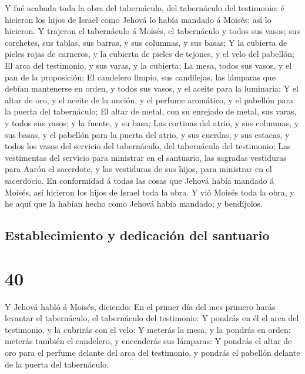  Y fué acabada toda la obra del tabernáculo, del
tabernáculo del testimonio: é hicieron los hijos de Israel como Jehová
lo había mandado á Moisés: así lo hicieron.  Y trajeron
el tabernáculo á Moisés, el tabernáculo y todos sus vasos; sus
corchetes, sus tablas, sus barras, y sus columnas, y sus basas;
 Y la cubierta de pieles rojas de carneros, y la cubierta
de pieles de tejones, y el velo del pabellón;  El arca
del testimonio, y sus varas, y la cubierta;  La mesa,
todos sus vasos, y el pan de la proposición;  El
candelero limpio, sus candilejas, las lámparas que debían mantenerse en
orden, y todos sus vasos, y el aceite para la luminaria; 
Y el altar de oro, y el aceite de la unción, y el perfume aromático, y
el pabellón para la puerta del tabernáculo;  El altar de
metal, con su enrejado de metal, sus varas, y todos sus vasos; y la
fuente, y su basa;  Las cortinas del atrio, y sus
columnas, y sus basas, y el pabellón para la puerta del atrio, y sus
cuerdas, y sus estacas, y todos los vasos del servicio del tabernáculo,
del tabernáculo del testimonio;  Las vestimentas del
servicio para ministrar en el santuario, las sagradas vestiduras para
Aarón el sacerdote, y las vestiduras de sus hijos, para ministrar en el
sacerdocio.  En conformidad á todas las cosas que Jehová
había mandado á Moisés, así hicieron los hijos de Israel toda la obra.
 Y vió Moisés toda la obra, y he aquí que la habían hecho
como Jehová había mandado; y bendíjolos.

\hypertarget{establecimiento-y-dedicaciuxf3n-del-santuario}{%
\subsection{Establecimiento y dedicación del
santuario}\label{establecimiento-y-dedicaciuxf3n-del-santuario}}

\hypertarget{section-39}{%
\section{40}\label{section-39}}

 Y Jehová habló á Moisés, diciendo:  En el
primer día del mes primero harás levantar el tabernáculo, el tabernáculo
del testimonio:  Y pondrás en él el arca del testimonio, y
la cubrirás con el velo:  Y meterás la mesa, y la pondrás
en orden: meterás también el candelero, y encenderás sus lámparas:
 Y pondrás el altar de oro para el perfume delante del
arca del testimonio, y pondrás el pabellón delante de la puerta del
tabernáculo.

